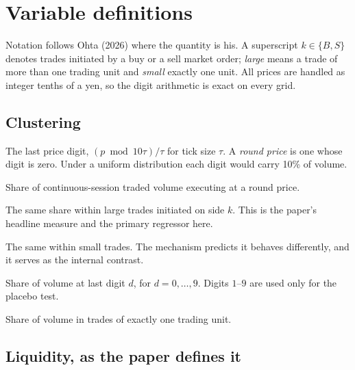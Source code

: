 \section{Variable definitions}
\label{app:variables}

Notation follows Ohta (2026) where the quantity is his. A superscript $k \in
\{B, S\}$ denotes trades initiated by a buy or a sell market order; \emph{large}
means a trade of more than one trading unit and \emph{small} exactly one unit.
All prices are handled as integer tenths of a yen, so the digit arithmetic is
exact on every grid.

\subsection*{Clustering}

\begin{description}[leftmargin=6.5em, style=nextline, nosep, font=\normalfont\itshape]
\item[$\mathit{digit}$] The last price digit, $(p \bmod 10\tau)/\tau$ for tick
  size $\tau$. A \emph{round price} is one whose digit is zero. Under a uniform
  distribution each digit would carry 10\% of volume.
\item[$M^{0}$] Share of continuous-session traded volume executing at a round
  price.
\item[$M^{kLarge0}$] The same share within large trades initiated on side $k$.
  This is the paper's headline measure and the primary regressor here.
\item[$M^{kSmall0}$] The same within small trades. The mechanism predicts it
  behaves differently, and it serves as the internal contrast.
\item[$M^{d}$] Share of volume at last digit $d$, for $d = 0,\dots,9$. Digits
  $1$--$9$ are used only for the placebo test.
\item[$\mathit{Small}$] Share of volume in trades of exactly one trading unit.
\end{description}

\subsection*{Liquidity, as the paper defines it}

